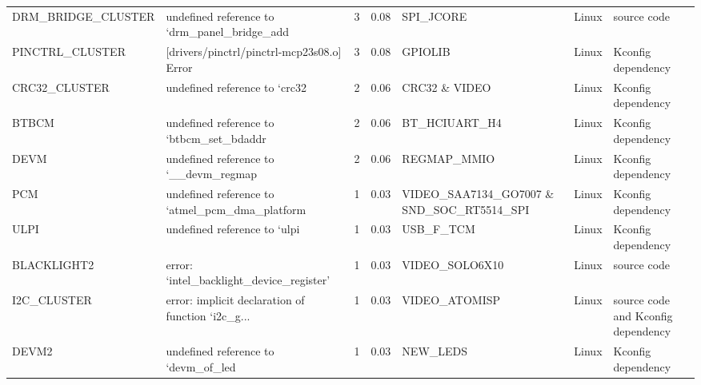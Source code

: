 \begin{tabular}{llrrlll}
 DRM\_BRIDGE\_CLUSTER &       undefined reference to `drm\_panel\_bridge\_add &            3 &        0.08 &                                          SPI\_JCORE &        Linux &                           source code  \\
    PINCTRL\_CLUSTER &         [drivers/pinctrl/pinctrl-mcp23s08.o] Error &            3 &        0.08 &                                           GPIOLIB  &        Linux &                     Kconfig dependency \\
      CRC32\_CLUSTER &                      undefined reference to `crc32 &            2 &        0.06 &                                      CRC32 \& VIDEO &        Linux &                     Kconfig dependency \\
              BTBCM &           undefined reference to `btbcm\_set\_bdaddr &            2 &        0.06 &                                      BT\_HCIUART\_H4 &        Linux &                     Kconfig dependency \\
               DEVM &              undefined reference to `\_\_devm\_regmap &            2 &        0.06 &                                       REGMAP\_MMIO  &        Linux &                     Kconfig dependency \\
                PCM &     undefined reference to `atmel\_pcm\_dma\_platform &            1 &        0.03 &         VIDEO\_SAA7134\_GO7007 \& SND\_SOC\_RT5514\_SPI  &        Linux &                     Kconfig dependency \\
               ULPI &                       undefined reference to `ulpi &            1 &        0.03 &                                          USB\_F\_TCM &        Linux &                     Kconfig dependency \\
        BLACKLIGHT2 &           error: ‘intel\_backlight\_device\_register’ &            1 &        0.03 &                                     VIDEO\_SOLO6X10 &        Linux &                            source code \\
        I2C\_CLUSTER &  error: implicit declaration of function ‘i2c\_g... &            1 &        0.03 &                                      VIDEO\_ATOMISP &        Linux &     source code and Kconfig dependency \\
              DEVM2 &                undefined reference to `devm\_of\_led &            1 &        0.03 &                                          NEW\_LEDS  &        Linux &                     Kconfig dependency \\
\bottomrule
\end{tabular}
